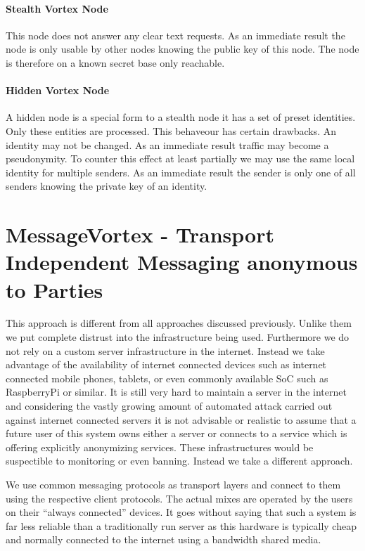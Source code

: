 \subsubsection{Stealth Vortex Node\label{sec:stealthNode}}
This node does not answer any clear text requests. As an immediate result the node is only usable by other nodes knowing the public key of this node. The node is therefore on a known secret base only reachable.

\subsubsection{Hidden Vortex Node\label{sec:hiddenNode}}
A hidden node is a special form to a stealth node it has a set of preset identities. Only these entities are processed. This behaveour has certain drawbacks. An identity may not be changed. As an immediate result traffic may become a pseudonymity. To counter this effect at least partially we may use the same local identity for multiple senders. As an immediate result the sender is only one of all senders knowing the private key of an identity.

\chapter{MessageVortex - Transport Independent Messaging anonymous to  Parties\label{sec:spec}}
This approach is different from all approaches discussed previously. Unlike them we put complete distrust into the infrastructure being used. Furthermore we do not rely on a custom server infrastructure in the internet. Instead we take advantage of the availability of internet connected devices such as internet connected mobile phones, tablets, or even commonly available SoC such as RaspberryPi or similar. It is still very hard to maintain a server in the internet and considering the vastly growing amount of automated attack carried out against internet connected servers it is not advisable or realistic to assume that a future user of this system owns either a server or connects to a service which is offering explicitly anonymizing services. These infrastructures would be suspectible to monitoring or even banning. Instead we take a different approach.

We use common messaging protocols as transport layers and connect to them using the respective client protocols. The actual mixes are operated by the users on their ``always connected'' devices. It goes without saying that such a system is far less reliable than a traditionally run server as this hardware is typically cheap and normally connected to the internet using a bandwidth shared media.

